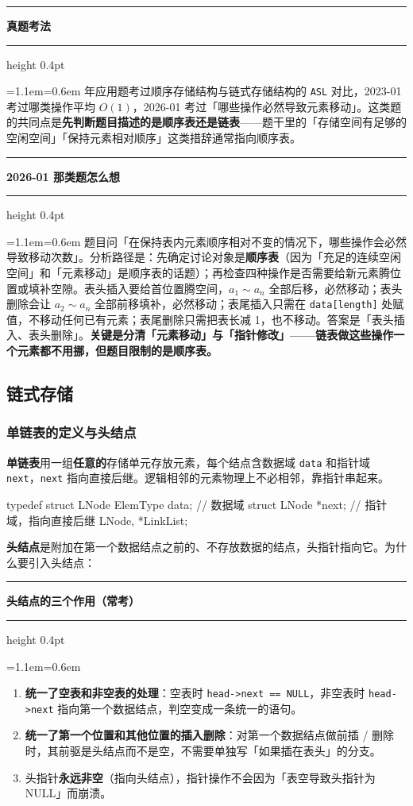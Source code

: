 \documentclass[11pt,openany,UTF8]{ctexbook}
\newcommand{\callouthead}[2]{%
  \par\addvspace{7pt}\noindent
  {\color{#1}\rule[-0.15em]{3pt}{1.05em}}\hspace{0.5em}%
  {\bfseries\color{#1}#2}\par\nobreak\vspace{-0.35em}%
  {\color{rulesep}\hrule height 0.4pt}\nobreak\vspace{0.45em}%
  \begingroup\small\setlength{\parindent}{0pt}%
  \leftskip=1.1em\rightskip=0.6em\noindent\ignorespaces}
\newcommand{\calloutend}{\par\endgroup\addvspace{7pt}}
\newenvironment{callkey}[1]{\callouthead{keybar}{#1}}{\calloutend}
\newenvironment{callwarn}[1]{\callouthead{warnbar}{#1}}{\calloutend}
\newenvironment{callexam}[1]{\callouthead{exambar}{#1}}{\calloutend}
\begin{document}
\begin{callexam}{真题考法}
2013 年应用题考过顺序存储结构与链式存储结构的 \texttt{ASL} 对比，2023-01 考过哪类操作平均 $O(1)$，2026-01 考过「哪些操作必然导致元素移动」。这类题的共同点是\textbf{先判断题目描述的是顺序表还是链表}——题干里的「存储空间有足够的空闲空间」「保持元素相对顺序」这类措辞通常指向顺序表。

\end{callexam}

\begin{callwarn}{2026-01 那类题怎么想}
题目问「在保持表内元素顺序相对不变的情况下，哪些操作会必然导致移动次数」。分析路径是：先确定讨论对象是\textbf{顺序表}（因为「充足的连续空闲空间」和「元素移动」是顺序表的话题）；再检查四种操作是否需要给新元素腾位置或填补空隙。表头插入要给首位置腾空间，$a_1 \sim a_n$ 全部后移，必然移动；表头删除会让 $a_2 \sim a_n$ 全部前移填补，必然移动；表尾插入只需在 \texttt{data[length]\allowbreak{}} 处赋值，不移动任何已有元素；表尾删除只需把表长减 1，也不移动。答案是「表头插入、表头删除」。\textbf{关键是分清「元素移动」与「指针修改」——链表做这些操作一个元素都不用挪，但题目限制的是顺序表。}

\end{callwarn}

\subsection{链式存储}

\subsubsection{单链表的定义与头结点}

\textbf{单链表}用一组\textbf{任意的}存储单元存放元素，每个结点含数据域 \texttt{data} 和指针域 \texttt{next}，\texttt{next} 指向直接后继。逻辑相邻的元素物理上不必相邻，靠指针串起来。

\begin{codebox}
typedef struct LNode {
    ElemType data;         // 数据域
    struct LNode *next;    // 指针域，指向直接后继
} LNode, *LinkList;
\end{codebox}

\textbf{头结点}是附加在第一个数据结点之前的、不存放数据的结点，头指针指向它。为什么要引入头结点：

\begin{callkey}{头结点的三个作用（常考）}
\begin{enumerate}
\item \textbf{统一了空表和非空表的处理}：空表时 \texttt{head->\allowbreak{}next =\allowbreak{}=\allowbreak{} NULL}，非空表时 \texttt{head->\allowbreak{}next} 指向第一个数据结点，判空变成一条统一的语句。
\item \textbf{统一了第一个位置和其他位置的插入删除}：对第一个数据结点做前插 / 删除时，其前驱是头结点而不是空，不需要单独写「如果插在表头」的分支。
\item 头指针\textbf{永远非空}（指向头结点），指针操作不会因为「表空导致头指针为 NULL」而崩溃。
\end{enumerate}
\end{callkey}
\end{document}

